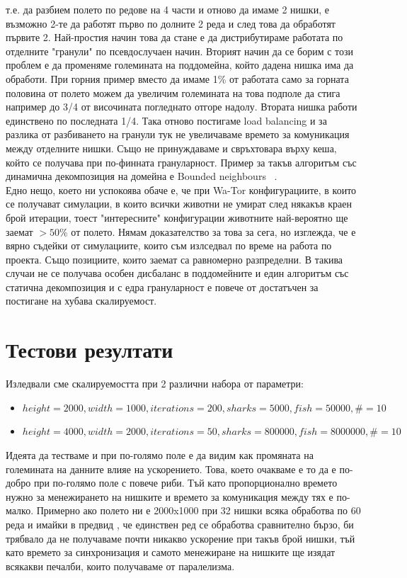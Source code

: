 \documentclass[12pt]{article}
\begin{document}
т.е. да разбием полето по редове на 4 части и отново да имаме 2 нишки, е възможно 2-те да работят първо по долните 2
реда и след това да обработят първите 2. Най-простия начин това да стане е да дистрибутираме
работата по отделните "гранули" по псевдослучаен начин. Вторият начин да се борим с този проблем е да променяме големината
на поддомейна, който дадена нишка има да обработи. При горния пример вместо да имаме 1\% от работата само за
горната половина от полето можем да увеличим големината на това подполе да стига например до 3/4 от височината погледнато
отгоре надолу. Втората нишка работи единствено по последната 1/4. Така отново постигаме load balancing и за разлика
от разбиването на гранули тук не увеличаваме времето за комуникация между отделните нишки. Също не принуждаваме
и свръхтовара върху кеша, който се получава при по-финната грануларност. Пример за такъв алгоритъм със динамична
декомпозиция на домейна е Bounded neighbours ~\cite{bounded_neighbours}.
\\
Едно нещо, което ни успокоява обаче е, че при Wa-Tor конфигурациите, в които се получават симулации, в които всички животни
не умират след някакъв краен брой итерации, тоест "интересните" конфигурации животните най-вероятно ще заемат $> 50\%$ от полето.
Нямам доказателство за това за сега, но изглежда, че е вярно съдейки от симулациите, които съм излседвал по време на работа
по проекта. Също позициите, които заемат са равномерно разпределни. В такива случаи не се получава особен дисбаланс в поддомейните
и един алгоритъм със статична декомпозиция и с едра грануларност е повече от достатъчен за постигане на хубава скалируемост.

\section{Тестови резултати}

\bigbreak
Изледвали сме скалируемостта при 2 различни набора от параметри:
\begin{itemize}
	\item $height = 2000, width = 1000, iterations = 200, sharks = 5000, fish = 50 000, \# = 10$
	\item $height = 4000, width = 2000, iterations = 50, sharks = 800 000, fish = 8 000 000, \# = 10$
\end{itemize}

Идеята да тестваме и при по-голямо поле е да видим как промяната на големината на данните
влияе на ускорението. Това, което очакваме е то да е по-добро при по-голямо поле с повече риби.
Тъй като пропорционално времето нужно за менежирането на нишките и времето за комуникация между тях
е по-малко. Примерно ако полето ни е 2000x1000 при 32 нишки всяка обработва по 60 реда и имайки в предвид
, че единствен ред се обработва сравнително бързо, би трябвало да не получаваме почти никакво ускорение при
такъв брой нишки, тъй като времето за синхронизация и самото менежиране на нишките ще изядат всякакви
печалби, които получаваме от паралелизма.
\end{document}
